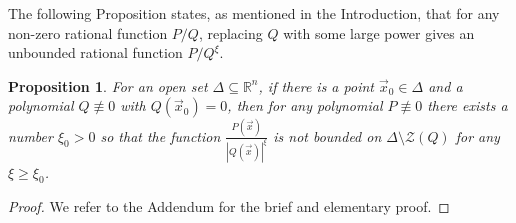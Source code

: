 \documentclass[12pt]{amsart}
\newtheorem{prop}[thm]{Proposition}
\theoremstyle{definition}
\theoremstyle{remark}
\numberwithin{equation}{section}
\newcommand{\re}{\mathbb{R}}
\newcommand{\vv}{\mathcal{Z}}
\begin{document}
The following Proposition states, as mentioned in the Introduction, that for any non-zero rational function $P/Q$, replacing $Q$ with some large power gives an unbounded rational function $P/Q^{\xi}$.
\begin{prop}\label{lem2.7}
  For an open set $\Delta\subseteq\re^n$, if there is a point $\vec x_0\in\Delta$ and a polynomial $Q\not\equiv0$ with $Q(\vec x_0)=0$, then for any polynomial $P\not\equiv0$ there exists a number $\xi_0>0$ so that the function $\displaystyle{\frac{P(\vec x)}{|Q(\vec x)|^\xi}}$ is not bounded on $\Delta\setminus\vv(Q)$ for any $\xi\ge\xi_0$.
%
\end{prop}
\begin{proof}   
  We refer to the Addendum \cite{cp} for the brief and elementary proof.
%
%
\end{proof}
\end{document}
